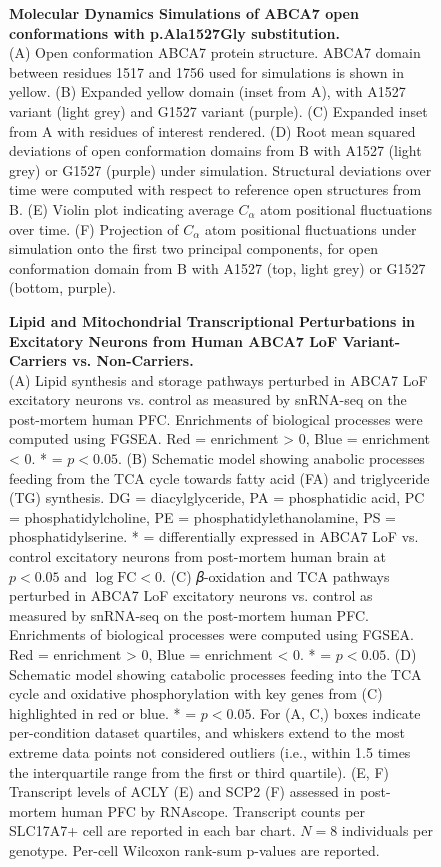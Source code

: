 \begin{figure}[ht]
    \centering
    \caption{
        \textbf{Molecular Dynamics Simulations of ABCA7 open conformations with p.Ala1527Gly substitution.}\\[1ex]
        (A) Open conformation ABCA7 protein structure. ABCA7 domain between residues 1517 and 1756 used for simulations is shown in yellow. 
        (B) Expanded yellow domain (inset from A), with A1527 variant (light grey) and G1527 variant (purple). 
        (C) Expanded inset from A with residues of interest rendered. 
        (D) Root mean squared deviations of open conformation domains from B with A1527 (light grey) or G1527 (purple) under simulation. Structural deviations over time were computed with respect to reference open structures from B. 
        (E) Violin plot indicating average $C_\alpha$ atom positional fluctuations over time. 
        (F) Projection of $C_\alpha$ atom positional fluctuations under simulation onto the first two principal components, for open conformation domain from B with A1527 (top, light grey) or G1527 (bottom, purple). 
    }
    \label{fig:md_simulations}
\end{figure}

\begin{figure}[ht]
    \centering
    \caption{
        \textbf{Lipid and Mitochondrial Transcriptional Perturbations in Excitatory Neurons from Human ABCA7 LoF Variant-Carriers vs. Non-Carriers.}\\[1ex]
        (A) Lipid synthesis and storage pathways perturbed in ABCA7 LoF excitatory neurons vs. control as measured by snRNA-seq on the post-mortem human PFC. Enrichments of biological processes were computed using FGSEA. Red = enrichment > 0, Blue = enrichment < 0. * = $p<0.05$. 
        (B) Schematic model showing anabolic processes feeding from the TCA cycle towards fatty acid (FA) and triglyceride (TG) synthesis. DG = diacylglyceride, PA = phosphatidic acid, PC = phosphatidylcholine, PE = phosphatidylethanolamine, PS = phosphatidylserine. * = differentially expressed in ABCA7 LoF vs. control excitatory neurons from post-mortem human brain at $p<0.05$ and $\log\text{FC}<0$. 
        (C) 𝛽-oxidation and TCA pathways perturbed in ABCA7 LoF excitatory neurons vs. control as measured by snRNA-seq on the post-mortem human PFC. Enrichments of biological processes were computed using FGSEA. Red = enrichment > 0, Blue = enrichment < 0. * = $p<0.05$. 
        (D) Schematic model showing catabolic processes feeding into the TCA cycle and oxidative phosphorylation with key genes from (C) highlighted in red or blue. * = $p<0.05$. For (A, C,) boxes indicate per-condition dataset quartiles, and whiskers extend to the most extreme data points not considered outliers (i.e., within 1.5 times the interquartile range from the first or third quartile). 
        (E, F) Transcript levels of ACLY (E) and SCP2 (F) assessed in post-mortem human PFC by RNAscope. Transcript counts per SLC17A7+ cell are reported in each bar chart. $N = 8$ individuals per genotype. Per-cell Wilcoxon rank-sum p-values are reported.
    }
    \label{fig:lipid_mitochondrial_perturbations}
\end{figure}

